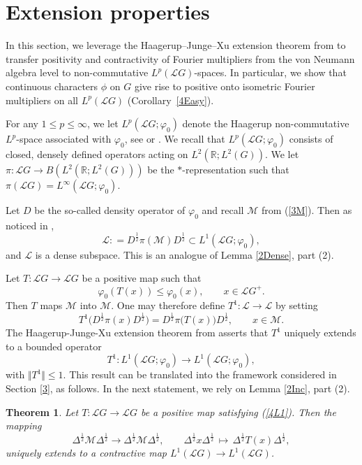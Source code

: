 \documentclass[12pt]{amsart}
\newcommand{\Rdb}{\mbox{$\mathbb{R}$}}
\newcommand{\M}{\mbox{${\mathcal M}$}}
\newcommand{\norm}[1]{\Vert#1\Vert}
\newtheorem{theorem}{Theorem}[section]
\theoremstyle{remark}
\theoremstyle{definition}
\numberwithin{equation}{section}
\begin{document}
\medskip
\section{Extension properties}\label{4}

In this section, we leverage the Haagerup--Junge--Xu extension theorem from \cite{HJX} to transfer positivity and contractivity of Fourier multipliers from the von Neumann algebra level to non-commutative $L^p({\mathcal L}G)$-spaces. In particular, we show that continuous characters $\phi$ on $G$ give rise to positive onto isometric Fourier multipliers on all $L^p(\mathcal{L}G)$ (Corollary~\ref{4Easy}).


For any $1\leq p\leq \infty$, we let $L^p({\mathcal L}G;\varphi_0)$ denote
the Haagerup non-commutative $L^p$-space associated with $\varphi_0$,
see \cite{H, Terp0, HJX} or \cite[Chapter 9]{Hiai}. 
We recall that $L^p({\mathcal L}G;\varphi_0)$ consists of closed, densely defined
operators acting on $L^2(\Rdb;L^2(G))$. We let $\pi\colon
{\mathcal L}G\to B(L^2(\Rdb;L^2(G)))$ be the $*$-representation
such that $\pi({\mathcal L}G)=L^\infty({\mathcal L}G;\varphi_0)$.


Let $D$ be the so-called
density operator of $\varphi_0$ and recall $\M$ from (\ref{3M}).
Then as noticed in \cite[Remark 5.6]{HJX},
$$
{\mathcal L} : = D^\frac12 \pi(\M) D^\frac12 \subset L^1({\mathcal L}G;\varphi_0),
$$
and ${\mathcal L}$ is a dense subspace. This is an analogue of Lemma \ref{2Dense}, part  (2).

Let $T\colon {\mathcal L}G\to {\mathcal L}G$ be a positive map such that 
\begin{equation}\label{4L1}
\varphi_0(T(x))\leq\varphi_0(x),\qquad x\in {\mathcal L}G^+.
\end{equation}
Then $T$ maps $\M$ into $\M$. One may therefore define
$T^1\colon {\mathcal L}\to{\mathcal L}$ by 
setting 
$$
T^1\bigl(D^\frac12 \pi(x) D^\frac12) = D^\frac12 \pi\bigl(T(x)\bigr) D^\frac12 ,\qquad x\in \M.
$$
The Haagerup-Junge-Xu extension theorem
from \cite[Theorem 5.1 and Remark 5.6]{HJX} asserts that 
$T^1$ uniquely extends to a 
bounded operator 
$$
T^1\colon L^1({\mathcal L}G;\varphi_0)\longrightarrow L^1({\mathcal L}G;\varphi_0),
$$
with $\norm{T^1}\leq 1$.
This result can be translated into the framework considered in Section \ref{3}, as follows.
In the next statement, we rely on Lemma \ref{2Inc}, part (2).


\begin{theorem}\label{4Ext}
Let $T\colon {\mathcal L}G\to {\mathcal L}G$ be a positive map satisfying (\ref{4L1}).
Then the mapping 
$$
\Delta^{\frac12} \M\Delta^{\frac12}\longrightarrow 
\Delta^{\frac12} \M\Delta^{\frac12},\qquad 
\Delta^{\frac12} x\Delta^{\frac12}\,\mapsto\, \Delta^{\frac12} T(x)\Delta^{\frac12},
$$
uniquely extends to a contractive map $L^1({\mathcal L}G)\to 
L^1({\mathcal L}G)$.
\end{theorem}
\end{document}
